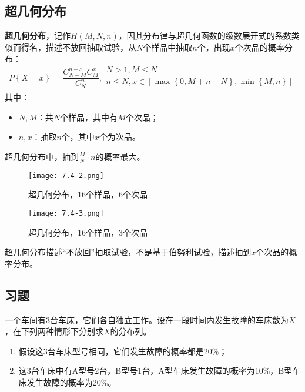 \subsection{超几何分布}

{\bf 超几何分布}，记作$H\left( M,N,n \right) $，因其分布律与超几何函数的级数展开式的系数类似而得名，描述不放回抽取试验，从$N$个样品中抽取$n$个，出现$x$个次品的概率分布：
\[
P\left\{ X=x \right\} =\frac{C_{N-M}^{n-x}C_{M}^{x}}{C_{N}^{n}}, \begin{array}{l}
	N>1,M\leqslant N\\
	n\leqslant N,x\in \left[ \max \left\{ 0,M+n-N \right\} ,\min \left\{ M,n \right\} \right]\\
\end{array}
\]
其中：
\begin{itemize}
    \item $N,M$：共$N$个样品，其中有$M$个次品；
    \item $n,x$：抽取$n$个，其中$x$个为次品。
\end{itemize}
超几何分布中，抽到$\frac{M}{N}\cdot n$的概率最大。

\begin{figure}[h]
\centering
\texttt{[image: 7.4-2.png]}
\caption{超几何分布，16个样品，6个次品}
\end{figure}
\begin{figure}[h]
\centering
\texttt{[image: 7.4-3.png]}
\caption{超几何分布，16个样品，3个次品}
\end{figure}

\begin{tcolorbox}
超几何分布描述“不放回”抽取试验，不是基于伯努利试验，描述抽到$x$个次品的概率分布。
\end{tcolorbox}

\subsection{习题}

\begin{example}
一个车间有3台车床，它们各自独立工作。设在一段时间内发生故障的车床数为$X$，在下列两种情形下分别求$X$的分布列。
\begin{enumerate}
    \item 假设这3台车床型号相同，它们发生故障的概率都是20\%；
    \item 这3台车床中有A型号2台，B型号1台，A型车床发生故障的概率为10\%，B型车床发生故障的概率为20\%。
\end{enumerate}
\end{example}

